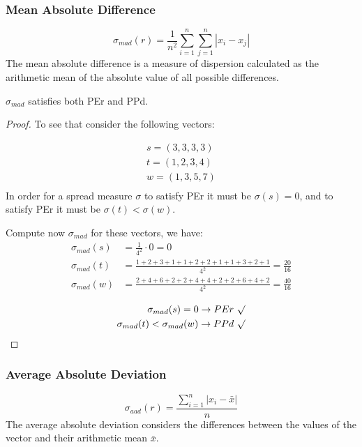 \documentclass[version=3.21, pagesize, notitlepage, twoside=off, bibliography=totoc, DIV=calc, fontsize=12pt, a4paper]{scrartcl}
\begin{document}
\subsubsection{Mean Absolute Difference}
\[\sigma_{mad}(r)= \frac{1}{n^2} \sum_{i=1}^{n}\sum_{j=1}^{n}|x_i-x_j| \]
The mean absolute difference is a measure of dispersion calculated as the arithmetic mean of the absolute value of all possible differences. 
\begin{proposition}
	$\sigma_{mad}$ satisfies both PEr and PPd.
\end{proposition}
\begin{proof}
	To see that consider the following vectors:
	\begin{example}
		\label{ex:spreadVectors}
		\begin{align}
		s=(3,3,3,3) \\
		t=(1,2,3,4) \\
		w=(1,3,5,7) \\
		\end{align}
		In order for a spread measure $\sigma$ to satisfy PEr it must be $\sigma(s)=0$, and to satisfy PEr it must be $\sigma(t)<\sigma(w)$.
	\end{example}
		Compute now $\sigma_{mad}$ for these vectors, we have:
		\begin{align}
		\sigma_{mad}(s) &= \frac{1}{4^2} \cdot 0 =0 \\
		\sigma_{mad}(t) &= \frac{1+2+3+1+1+2+2+1+1+3+2+1}{4^2}=\frac{20}{16} \\
		\sigma_{mad}(w) &= \frac{2+4+6+2+2+4+4+2+2+6+4+2}{4^2}=\frac{40}{16} \\
		\end{align}
		\begin{align}
		\sigma_{mad}(s) = 0 \rightarrow PEr \ \surd \\
		\sigma_{mad}(t) < \sigma_{mad}(w) \rightarrow PPd \ \surd \\
		\end{align}
\end{proof}


\subsubsection{Average Absolute Deviation}
\[\sigma_{aad}(r)= \frac{\sum_{i=1}^{n}|x_i-\bar{x}|}{n}\]
The average absolute deviation considers the differences between the values of the vector and their arithmetic mean $\bar{x}$.
\end{document}
